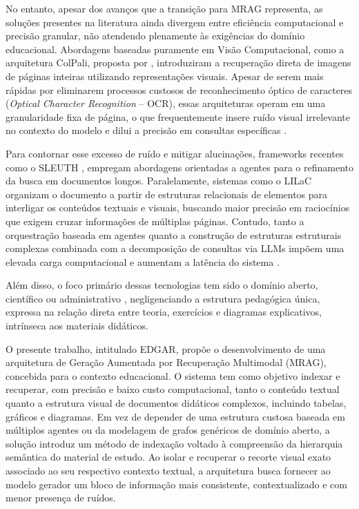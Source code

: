 No entanto, apesar dos avanços que a transição para MRAG representa, as soluções presentes na literatura ainda divergem entre eficiência computacional e precisão granular, não atendendo plenamente às exigências do domínio educacional. Abordagens baseadas puramente em Visão Computacional, como a arquitetura ColPali, proposta por , introduziram a recuperação direta de imagens de páginas inteiras utilizando representações visuais. Apesar de serem mais rápidas por eliminarem processos custosos de reconhecimento óptico de caracteres (\textit{Optical Character Recognition} -- OCR), essas arquiteturas operam em uma granularidade fixa de página, o que frequentemente insere ruído visual irrelevante no contexto do modelo e dilui a precisão em consultas específicas .

Para contornar esse excesso de ruído e mitigar alucinações, frameworks recentes como o SLEUTH , empregam abordagens orientadas a agentes para o refinamento da busca em documentos longos. Paralelamente, sistemas como o LILaC  organizam o documento a partir de estruturas relacionais de elementos para interligar os conteúdos textuais e visuais, buscando maior precisão em raciocínios que exigem cruzar informações de múltiplas páginas. Contudo, tanto a orquestração baseada em agentes quanto a construção de estruturas estruturais complexas combinada com a decomposição de consultas via LLMs impõem uma elevada carga computacional e aumentam a latência do sistema .

Além disso, o foco primário dessas tecnologias tem sido o domínio aberto, científico ou administrativo , negligenciando a estrutura pedagógica única, expressa na relação direta entre teoria, exercícios e diagramas explicativos, intrínseca aos materiais didáticos.

O presente trabalho, intitulado EDGAR, propõe o desenvolvimento de uma arquitetura de Geração Aumentada por Recuperação Multimodal (MRAG), concebida para o contexto educacional. O sistema tem como objetivo indexar e recuperar, com precisão e baixo custo computacional, tanto o conteúdo textual quanto a estrutura visual de documentos didáticos complexos, incluindo tabelas, gráficos e diagramas. Em vez de depender de uma estrutura custosa baseada em múltiplos agentes ou da modelagem de grafos genéricos de domínio aberto, a solução introduz um método de indexação voltado à compreensão da hierarquia semântica do material de estudo. Ao isolar e recuperar o recorte visual exato associado ao seu respectivo contexto textual, a arquitetura busca fornecer ao modelo gerador um bloco de informação mais consistente, contextualizado e com menor presença de ruídos.

